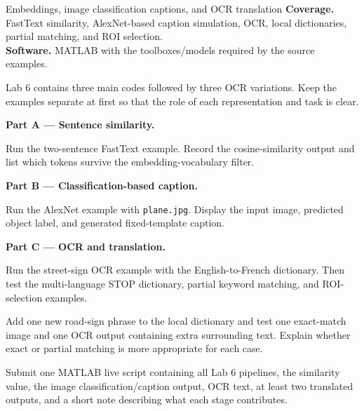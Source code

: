 
\begin{labproject}{Embeddings, image classification captions, and OCR translation}
\textbf{Coverage.} FastText similarity, AlexNet-based caption simulation, OCR, local dictionaries, partial matching, and ROI selection.\\
\textbf{Software.} MATLAB with the toolboxes/models required by the source examples.

\begin{labmode}
Lab 6 contains three main codes followed by three OCR variations. Keep the examples separate at first so that the role of each representation and task is clear.
\end{labmode}

\medskip\noindent\textbf{Part A --- Sentence similarity.}\par
Run the two-sentence FastText example. Record the cosine-similarity output and list which tokens survive the embedding-vocabulary filter.

\medskip\noindent\textbf{Part B --- Classification-based caption.}\par
Run the AlexNet example with \texttt{plane.jpg}. Display the input image, predicted object label, and generated fixed-template caption.

\medskip\noindent\textbf{Part C --- OCR and translation.}\par
Run the street-sign OCR example with the English-to-French dictionary. Then test the multi-language STOP dictionary, partial keyword matching, and ROI-selection examples.

\begin{tryit}
Add one new road-sign phrase to the local dictionary and test one exact-match image and one OCR output containing extra surrounding text. Explain whether exact or partial matching is more appropriate for each case.
\end{tryit}
\end{labproject}

\begin{labdeliverable}
Submit one MATLAB live script containing all Lab 6 pipelines, the similarity value, the image classification/caption output, OCR text, at least two translated outputs, and a short note describing what each stage contributes.
\end{labdeliverable}
